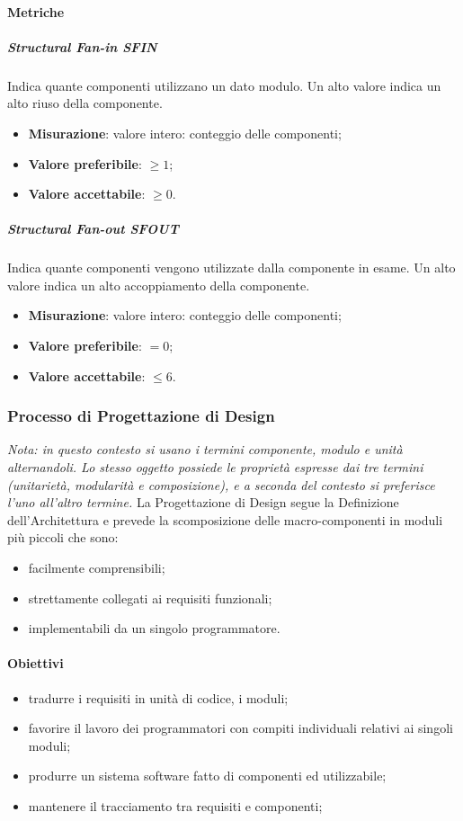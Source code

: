 		\paragraph{Metriche}
			\subparagraph{Structural Fan-in \textbf{SFIN}}
			Indica quante componenti utilizzano un dato modulo. Un alto valore indica un alto riuso della componente.
			\begin{itemize}
				\item \textbf{Misurazione}: valore intero: conteggio delle componenti;
				\item \textbf{Valore preferibile}: $ \geq 1$;
				\item \textbf{Valore accettabile}: $ \geq 0$.
			\end{itemize}
			\subparagraph{Structural Fan-out \textbf{SFOUT}}
			Indica quante componenti vengono utilizzate dalla componente in esame. Un alto valore indica un alto
accoppiamento della componente.
			\begin{itemize}
				\item \textbf{Misurazione}: valore intero: conteggio delle componenti;
				\item \textbf{Valore preferibile}: $ = 0$;
				\item \textbf{Valore accettabile}: $ \leq 6$.
			\end{itemize}
			
	\subsubsection{Processo di Progettazione di Design}
	\textit{Nota: in questo contesto si usano i termini componente, modulo e unità alternandoli. Lo stesso oggetto possiede le proprietà espresse dai tre termini (unitarietà, modularità e composizione), e a seconda del contesto si preferisce l'uno all'altro termine.}\newline 
	La Progettazione di Design segue la Definizione dell'Architettura e prevede la scomposizione delle macro-componenti in moduli più piccoli che sono:
	\begin{itemize}
		\item facilmente comprensibili;
		\item strettamente collegati ai requisiti funzionali;
		\item implementabili da un singolo programmatore.
	\end{itemize}
		\paragraph{Obiettivi}
		\begin{itemize}
			\item tradurre i requisiti in unità di codice, i moduli;
			\item favorire il lavoro dei programmatori con compiti individuali relativi ai singoli moduli;
			\item produrre un sistema software fatto di componenti ed utilizzabile;
			\item mantenere il tracciamento tra requisiti e componenti;
		\end{itemize}
